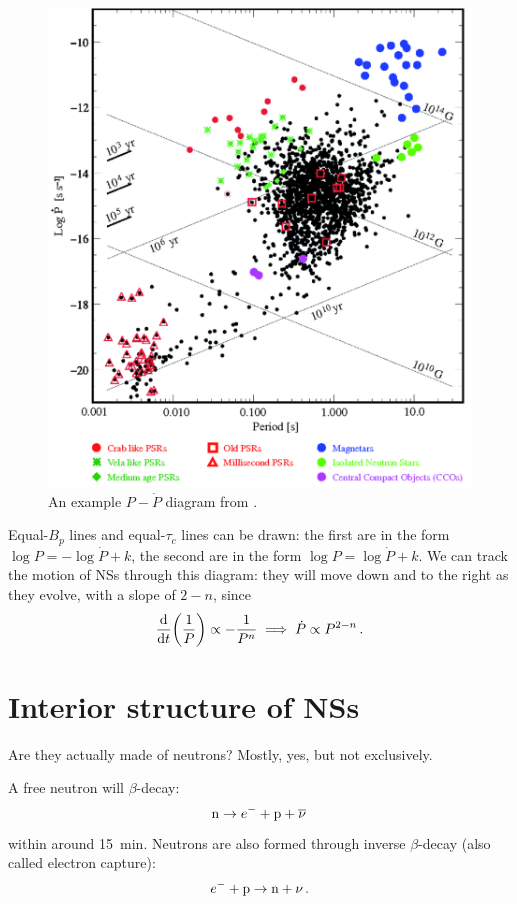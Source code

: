 \documentclass[main.tex]{subfiles}
\begin{document}
\begin{figure}[ht]
\centering
\includegraphics[width=.8\textwidth]{figures/p-pdot-diagram}
\caption{An example \(P-\dot{P}\) diagram from \textcite[]{beckerAutonomousSpacecraftNavigation2013}.}
\label{fig:p-pdot-diagram}
\end{figure}

Equal-\(B_p\) lines and equal-\(\tau _c\) lines can be drawn: 
the first are in the form \(\log P = - \log \dot{P} + k\), the second are in the form \(\log P = \log \dot{P} + k\). 
We can track the motion of NSs through this diagram: they will move down and to the right as they evolve, with a slope of \(2 - n\), since 
%
\begin{align}
\dv{t}( \frac{1}{P}) \propto - \frac{1}{P^{n}} \implies \dot{P} \propto P^{2-n}
\,.
\end{align} 

\section{Interior structure of NSs}

Are they actually made of neutrons? Mostly, yes, but not exclusively.

A free neutron will \(\beta \)-decay:  
%
\begin{align}
\ce{n} \to e^{-} + \ce{p} + \overline{\nu}
\,
\end{align}
%
within around \SI{15}{min}. Neutrons are also formed through inverse \(\beta \)-decay (also called electron capture): 
%
\begin{align}
e^{-} + \ce{p} \to \ce{n} + \nu 
\,.
\end{align}
\end{document}
